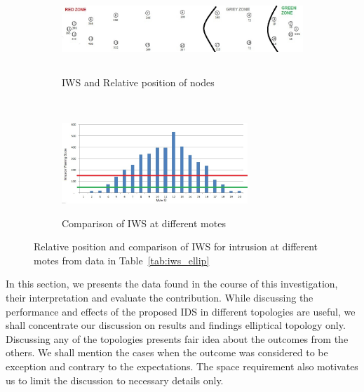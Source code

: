 \documentclass[conference,final]{IEEEtran}
\newcommand{\notedme}[1]{\raisebox{0pt}[0pt][0pt]{\pdfcomment[open=true,color=blue]{#1}}}
\begin{document}
\begin{figure}[t!]
\label{fig:ellip}
    \centering
    \begin{subfigure}[b]{0.5\textwidth}
        \centering
        \includegraphics[height=1in, width=4in]{Elliptical}
        \label{subfig:elliptopo}
        \caption{IWS and Relative position of nodes}
    \end{subfigure}%
    ~ 
    \begin{subfigure}[b]{0.5\textwidth}
        \centering
        \includegraphics[height=1.2in]{Elliptical_column}
        \label{subfig:ellipgraph}
        \caption{Comparison of IWS at different motes}
    \end{subfigure}
    \caption{Relative position and comparison of IWS for intrusion at different motes from data in Table~\ref{tab:iws_ellip}}
\end{figure}

In this section, we presents the data found in the course of this investigation, their interpretation and evaluate the contribution.
While discussing the performance and effects of the proposed IDS in different topologies are useful, we shall concentrate our discussion on results and findings elliptical topology only.
Discussing any of the topologies presents fair idea about the outcomes from the others. 
We shall mention the cases when the outcome was considered to be exception and contrary to the expectations.
The space requirement also motivates us to limit the discussion to necessary details only.
\end{document}

